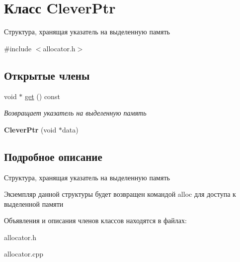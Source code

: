 \hypertarget{class_clever_ptr}{}\section{Класс Clever\+Ptr}
\label{class_clever_ptr}


Структура, хранящая указатель на выделенную память  




{\ttfamily \#include $<$allocator.\+h$>$}

\subsection*{Открытые члены}
\begin{DoxyCompactItemize}
\item 
\mbox{\label{class_clever_ptr_a9f1b94cd94f846d6066f7cf6f034d63b}} 
void $\ast$ \mbox{\hyperlink{class_clever_ptr_a9f1b94cd94f846d6066f7cf6f034d63b}{get}} () const
\begin{DoxyCompactList}\small\item\em Возвращает указатель на выделенную память \end{DoxyCompactList}\item 
\mbox{\label{class_clever_ptr_a04d9f0c0def6a74f85ee0fe298a90780}} 
{\bfseries Clever\+Ptr} (void $\ast$data)
\end{DoxyCompactItemize}


\subsection{Подробное описание}
Структура, хранящая указатель на выделенную память 

Экземпляр данной структуры будет возвращен командой alloc для доступа к выделенной памяти 

Объявления и описания членов классов находятся в файлах\+:\begin{DoxyCompactItemize}
\item 
allocator.\+h\item 
allocator.\+cpp\end{DoxyCompactItemize}
